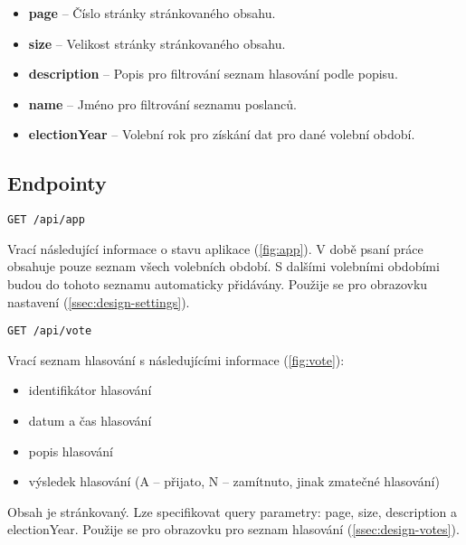 \begin{itemize}
	\item \textbf{page} -- Číslo stránky stránkovaného obsahu.
	\item \textbf{size} -- Velikost stránky stránkovaného obsahu.
	\item \textbf{description} -- Popis pro filtrování seznam hlasování podle popisu.
	\item \textbf{name} -- Jméno pro filtrování seznamu poslanců.
	\item \textbf{electionYear} -- Volební rok pro získání dat pro dané volební období.
\end{itemize}

\subsection*{Endpointy}

\begin{lstlisting}[label={lst:endpoint-app}] 
GET /api/app
\end{lstlisting}

\noindent Vrací následující informace o stavu aplikace (\ref{fig:app}). V době psaní práce obsahuje pouze seznam všech volebních období. S dalšími volebními obdobími budou do tohoto seznamu automaticky přidávány. Použije se pro obrazovku nastavení (\ref{ssec:design-settings}).

\vspace{10px}

\begin{lstlisting}[label={lst:endpoint-votes}] 
GET /api/vote
\end{lstlisting}

\noindent Vrací seznam hlasování s následujícími informace (\ref{fig:vote}):
\begin{itemize}
	\item identifikátor hlasování
	\item datum a čas hlasování
	\item popis hlasování
	\item výsledek hlasování (A -- přijato, N -- zamítnuto, jinak zmatečné hlasování)
\end{itemize}

\noindent Obsah je stránkovaný. Lze specifikovat query parametry: page, size, description a electionYear. Použije se pro obrazovku pro seznam hlasování (\ref{ssec:design-votes}).

\vspace{10px}

